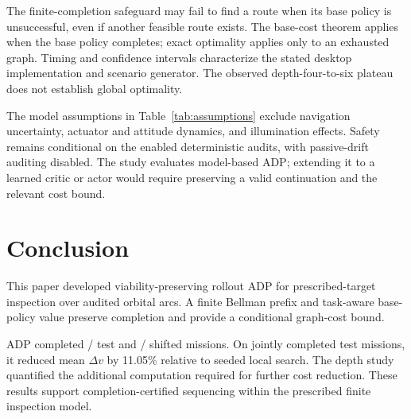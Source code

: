 The finite-completion safeguard may fail to find a route when its base policy is unsuccessful, even if another feasible route exists. The base-cost theorem applies when the base policy completes; exact optimality applies only to an exhausted graph. Timing and confidence intervals characterize the stated desktop implementation and scenario generator. The observed depth-four-to-six plateau does not establish global optimality.

The model assumptions in Table~\ref{tab:assumptions} exclude navigation uncertainty, actuator and attitude dynamics, and illumination effects. Safety remains conditional on the enabled deterministic audits, with passive-drift auditing disabled. The study evaluates model-based ADP; extending it to a learned critic or actor would require preserving a valid continuation and the relevant cost bound.

\section{Conclusion}
\label{sec:conclusion}

This paper developed viability-preserving rollout ADP for prescribed-target inspection over audited orbital arcs. A finite Bellman prefix and task-aware base-policy value preserve completion and provide a conditional graph-cost bound.

ADP completed \RTTestSuccess/\RTTestN{} test and \RTOodSuccess/\RTOodN{} shifted missions. On jointly completed test missions, it reduced mean $\Delta v$ by 11.05\% relative to seeded local search. The depth study quantified the additional computation required for further cost reduction. These results support completion-certified sequencing within the prescribed finite inspection model.


